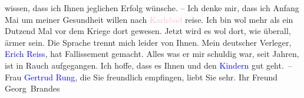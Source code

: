                     wissen, dass ich Ihnen jeglichen Erfolg wünsche. – Ich denke mir, dass ich
                        Anfang Mai um meiner Gesundheit willen nach \textcolor{pink}{Karlsbad}{}\ledrightnote{\textcolor{pink}{Karlsbad}} reise. Ich bin wol mehr als ein Dutzend Mal vor
                    dem Kriege dort gewesen. Jetzt wird es wol dort, wie überall,  ärmer sein. Die Sprache trennt mich leider
                    von Ihnen. Mein deutscher Verleger, \textcolor{blue}{Erich
                        Reiss}{}\ledrightnote{\textcolor{blue}{Erich Reiss}}, hat Fallissement gemacht. Alles was er mir schuldig war, seit
                    Jahren, ist in Rauch aufgegangen.\pend
           \pstart
           Ich hoffe, dass es Ihnen und den \textcolor{blue}{Kindern}{} gut geht. – Frau \textcolor{blue}{Gertrud Rung}{}\ledrightnote{\textcolor{blue}{Gertrud Rung}}, die Sie freundlich empfingen, liebt Sie
                    sehr. Ihr Freund \spacefill\mbox{Georg Brandes}\pend
           \endnumbering{}  
      
